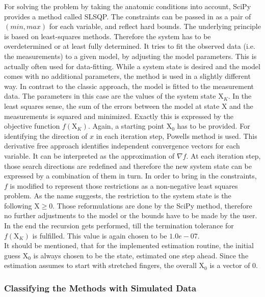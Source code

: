 For solving the problem by taking the anatomic conditions into account, SciPy provides a method called \ac{SLSQP}. The constraints can be passed in as a pair of $ (min,max) $ for each variable, and reflect hard bounds. The underlying principle is based on least-squares methods. Therefore the system has to be overdetermined or at least fully determined. It tries to fit the observed data (i.e. the measurements) to a given model, by adjusting the model parameters. This is actually often used for data-fitting. While a system state is desired and the model comes with no additional parameters, the method is used in a slightly different way. In contrast to the classic approach, the model is fitted to the measurement data. The parameters in this case are the values of the system state $ \mathrm{X}_K $. In the least squares sense, the sum of the errors between the model at state $ \mathrm{X} $ and the measurements is squared and minimized. Exactly this is expressed by the objective function $ f(\mathrm{X}_K) $. Again, a starting point $ \mathrm{X}_{0} $ has to be provided. For identifying the direction of $ x $ in each iteration step, Powells method \cite{powell1964efficient} is used. This derivative free approach identifies independent convergence vectors for each variable. It can be interpreted as the approximation of $ \nabla f $. At each iteration step, those search directions are redefined and therefore the new system state can be expressed by a combination of them in turn. In order to bring in the constraints, $ f $ is modified to represent those restrictions as a non-negative least squares problem. As the name suggests, the restriction to the system state is the following $ \mathrm{X} \geq 0$. Those reformulations are done by the SciPy method, therefore no further adjustments to the model or the bounds have to be made by the user. In the end the recursion gets performed, till the termination tolerance for $ f(\mathrm{X}_K) $ is fulfilled. This value is again chosen to be $ 1.0e-07 $.\\
It should be mentioned, that for the implemented estimation routine, the initial guess $ \mathrm{X}_{0} $ is always chosen to be the state, estimated one step ahead. Since the estimation assumes to start with stretched fingers, the overall $ \mathrm{X}_{0} $ is a vector of 0.  

\FloatBarrier
\subsubsection{Classifying the Methods with Simulated Data} \label{subsubsec:simEval}


